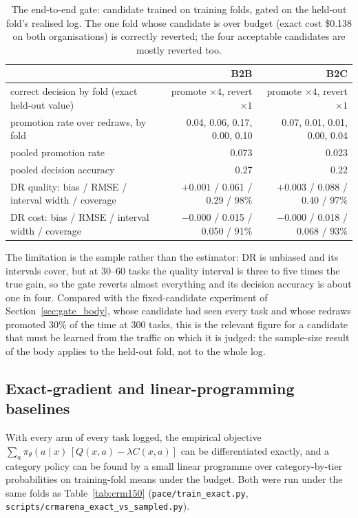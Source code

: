 \documentclass[10pt]{article}
\newcommand{\code}[1]{\texttt{#1}}
\begin{document}
\begin{table}[H]\centering\small
\begin{tabular}{lrr}\toprule
 & B2B & B2C \\\midrule
correct decision by fold (exact held-out value) & promote $\times4$, revert $\times1$ & promote $\times4$, revert $\times1$ \\
promotion rate over redraws, by fold & 0.04, 0.06, 0.17, 0.00, 0.10 & 0.07, 0.01, 0.01, 0.00, 0.04 \\
pooled promotion rate & 0.073 & 0.023 \\
pooled decision accuracy & 0.27 & 0.22 \\
DR quality: bias / RMSE / interval width / coverage & $+0.001$ / 0.061 / 0.29 / 98\% & $+0.003$ / 0.088 / 0.40 / 97\% \\
DR cost: bias / RMSE / interval width / coverage & $-0.000$ / 0.015 / 0.050 / 91\% & $-0.000$ / 0.018 / 0.068 / 93\% \\\bottomrule
\end{tabular}
\caption{The end-to-end gate: candidate trained on training folds, gated on the held-out fold's realised log. The one fold whose candidate is over budget (exact cost \$0.138 on both organisations) is correctly reverted; the four acceptable candidates are mostly reverted too.}
\label{tab:cvgate}
\end{table}

The limitation is the sample rather than the estimator: DR is unbiased and its intervals cover, but at 30--60 tasks the quality interval is three to five times the true gain, so the gate reverts almost everything and its decision accuracy is about one in four. Compared with the fixed-candidate experiment of Section~\ref{sec:gate_body}, whose candidate had seen every task and whose redraws promoted 30\% of the time at 300 tasks, this is the relevant figure for a candidate that must be learned from the traffic on which it is judged: the sample-size result of the body applies to the held-out fold, not to the whole log.

\subsection{Exact-gradient and linear-programming baselines}
\label{app:exact}

With every arm of every task logged, the empirical objective $\sum_a\pi_\theta(a\mid x)\,[Q(x,a)-\lambda C(x,a)]$ can be differentiated exactly, and a category policy can be found by a small linear programme over category-by-tier probabilities on training-fold means under the budget. Both were run under the same folds as Table~\ref{tab:crm150} (\code{pace/train\_exact.py}, \code{scripts/crmarena\_exact\_vs\_sampled.py}).
\end{document}
